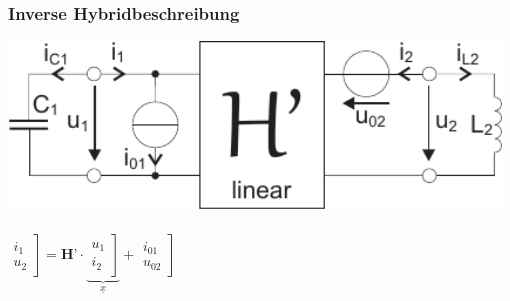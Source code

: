 \documentclass[a4paper,twocolumn,10pt]{article}
\begin{document}
\hfill
\begin{minipage}[t]{0.23\textwidth}
\subsubsection*{Inverse Hybridbeschreibung}
\includegraphics[width=0.98\textwidth]{Grafiken/ESBzweitenGrades4}\\\\
$\left.\begin{matrix}i_1 \\ u_2\end{matrix}\right]=\textbf{H'}\cdot \underbrace{\left.\begin{matrix}u_1 \\ i_2\end{matrix}\right]}_{\underline{x}}+\left.\begin{matrix}i_{01} \\ u_{02}\end{matrix}\right]$
\end{minipage}
\end{document}
